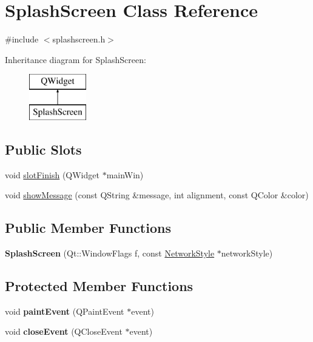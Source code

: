 \hypertarget{class_splash_screen}{}\section{Splash\+Screen Class Reference}
\label{class_splash_screen}


{\ttfamily \#include $<$splashscreen.\+h$>$}

Inheritance diagram for Splash\+Screen\+:\begin{figure}[H]
\begin{center}
\leavevmode
\includegraphics[height=2.000000cm]{class_splash_screen}
\end{center}
\end{figure}
\subsection*{Public Slots}
\begin{DoxyCompactItemize}
\item 
void \mbox{\hyperlink{class_splash_screen_ace6374d1889d704d4a41316540d9b47d}{slot\+Finish}} (Q\+Widget $\ast$main\+Win)
\item 
void \mbox{\hyperlink{class_splash_screen_a16635123e7906390e0aedb7d58ba9923}{show\+Message}} (const Q\+String \&message, int alignment, const Q\+Color \&color)
\end{DoxyCompactItemize}
\subsection*{Public Member Functions}
\begin{DoxyCompactItemize}
\item 
\mbox{\label{class_splash_screen_aa6f816612e26f1fec23e428b0f290c2d}} 
{\bfseries Splash\+Screen} (Qt\+::\+Window\+Flags f, const \mbox{\hyperlink{class_network_style}{Network\+Style}} $\ast$network\+Style)
\end{DoxyCompactItemize}
\subsection*{Protected Member Functions}
\begin{DoxyCompactItemize}
\item 
\mbox{\label{class_splash_screen_a1115e128bccb82b9a5391540aa87f3c5}} 
void {\bfseries paint\+Event} (Q\+Paint\+Event $\ast$event)
\item 
\mbox{\label{class_splash_screen_af2b8ee5e860e5584621eb6224ce7c959}} 
void {\bfseries close\+Event} (Q\+Close\+Event $\ast$event)
\end{DoxyCompactItemize}


